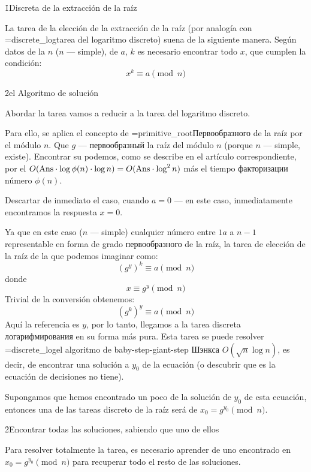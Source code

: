 \h1{Discreta de la extracción de la raíz}

La tarea de la elección de la extracción de la raíz (por analogía con \algohref=discrete_log{tarea del logaritmo discreto}) suena de la siguiente manera. Según datos de la $n$ ($n$ --- simple), de $a$, $k$ es necesario encontrar todo $x$, que cumplen la condición:
$$ x^k \equiv a \pmod{n} $$

\h2{el Algoritmo de solución}

Abordar la tarea vamos a reducir a la tarea del logaritmo discreto.

Para ello, se aplica el concepto de \algohref=primitive_root{Первообразного de la raíz por el módulo $n$}. Que $g$ --- первообразный la raíz del módulo $n$ (porque $n$ --- simple, existe). Encontrar su podemos, como se describe en el artículo correspondiente, por el $O( {\rm Ans} \cdot \log \phi(n) \cdot \log n) = O( {\rm Ans} \cdot \log^2 n)$ más el tiempo факторизации número $\phi(n)$.

Descartar de inmediato el caso, cuando $a=0$ --- en este caso, inmediatamente encontramos la respuesta $x=0$.

Ya que en este caso ($n$ --- simple) cualquier número entre $1 a$ a $n-1$ representable en forma de grado первообразного de la raíz, la tarea de elección de la raíz de la que podemos imaginar como:
$$ {\left( g^y \right)}^k \equiv a \pmod{n} $$
donde
$$ x \equiv g^y \pmod{n} $$
Trivial de la conversión obtenemos:
$$ {\left( g^k \right)}^y \equiv a \pmod{n} $$
Aquí la referencia es $y$, por lo tanto, llegamos a la tarea discreta логарифмирования en su forma más pura. Esta tarea se puede resolver \algohref=discrete_log{el algoritmo de baby-step-giant-step Шэнкса} $O( \sqrt{n} \log n )$, es decir, de encontrar una solución a $y_0$ de la ecuación (o descubrir que es la ecuación de decisiones no tiene).

Supongamos que hemos encontrado un poco de la solución de $y_0$ de esta ecuación, entonces una de las tareas discreto de la raíz será de $x_0 = g^{y_0} \pmod{n}$.

\h2{Encontrar todas las soluciones, sabiendo que uno de ellos}

Para resolver totalmente la tarea, es necesario aprender de uno encontrado en $x_0 = g^{y_0} \pmod{n}$ para recuperar todo el resto de las soluciones.

